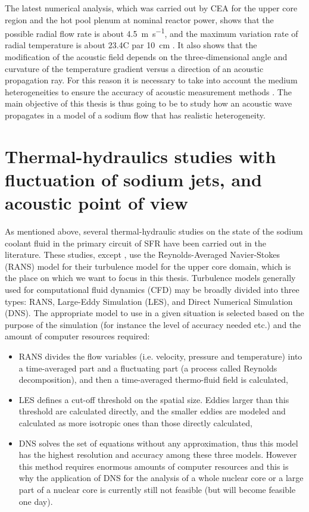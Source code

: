     The latest numerical analysis, which was carried out by CEA for the upper core region and the hot pool plenum at nominal reactor power, shows that the possible radial flow rate is
about \SI{4.5}{\meter\per\second}, and the maximum variation rate of radial temperature is about \num{23.4}\textdegree{}C par \SI{10}{\centi\meter}
\parencite{Haubensack2016Calculsthermohydrauliquesdu}. It also shows that the modification of the acoustic field depends on the three-dimensional angle
and curvature of the temperature gradient versus a direction of an acoustic propagation ray.
    For this reason it is necessary to take into account the medium heterogeneities to ensure the accuracy of acoustic measurement methods
\parencite{Massacret2014Etudedunemethode}.
%
    The main objective of this thesis is thus going to be to study how an acoustic wave propagates in a model of a sodium flow that has realistic heterogeneity.

\section{Thermal-hydraulics studies with fluctuation of sodium jets, and acoustic point of view}

    As mentioned above, several thermal-hydraulic studies on the state of the sodium coolant fluid in the primary circuit of SFR have been carried out in the
literature. These studies, except \textcite{Saxena2014Thermalhydraulicnumerical}, use the Reynolds-Averaged Navier-Stokes (RANS) model for their
turbulence model for the upper core domain, which is the place on which we want to focus in this thesis.
    Turbulence models generally used for computational fluid dynamics (CFD) may be broadly divided into three types: RANS, Large-Eddy Simulation (LES),
and Direct Numerical Simulation (DNS). The appropriate model to use in a given situation is selected based on the purpose of the simulation (for instance the level of accuracy needed etc.)
and the amount of computer resources required:
%
\vspace{-4mm}
    \begin{itemize}
    \item RANS divides the flow variables (i.e. velocity, pressure and temperature) into a time-averaged part and a fluctuating part (a process called
Reynolds decomposition), and then a time-averaged thermo-fluid field is calculated,
    \item LES defines a cut-off threshold on the spatial size. Eddies larger than this threshold are calculated directly, and the smaller eddies are
modeled and calculated as more isotropic ones than those directly calculated,
    \item DNS solves the set of equations without any approximation, thus this model has the highest resolution and accuracy among these three models. However this method
requires enormous amounts of computer resources and this is why the application of DNS for the analysis of a whole nuclear core or a large part of a nuclear
core is currently still not feasible (but will become feasible one day).
    \end{itemize}

